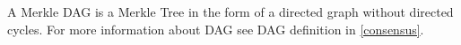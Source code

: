 A Merkle \ac{DAG}  is a Merkle Tree in the form of a directed graph without directed cycles. For more information about \ac{DAG} see \ac{DAG} definition in \ref{consensus}.